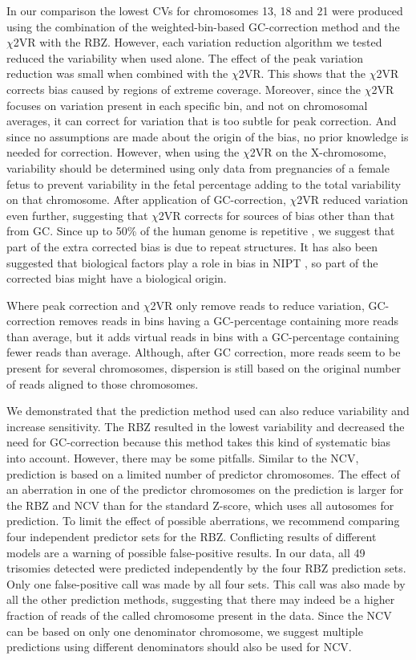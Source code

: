 In our comparison the lowest CVs for chromosomes 13, 18 and 21 were produced using the combination of the weighted-bin-based GC-correction method and the $\chi$2VR with the RBZ. 
However, each variation reduction algorithm we tested reduced the variability when used alone. 
The effect of the peak variation reduction was small when combined with the $\chi$2VR. 
This shows that the $\chi$2VR corrects bias caused by regions of extreme coverage. 
Moreover, since the $\chi$2VR focuses on variation present in each specific bin, and not on chromosomal averages, it can correct for variation that is too subtle for peak correction. 
And since no assumptions are made about the origin of the bias, no prior knowledge is needed for correction. 
However, when using the $\chi$2VR on the X-chromosome, variability should be determined using only data from pregnancies of a female fetus to prevent variability in the fetal percentage adding to the total variability on that chromosome. 
After application of GC-correction, $\chi$2VR reduced variation even further, suggesting that $\chi$2VR corrects for sources of bias other than that from GC. 
Since up to 50\% of the human genome is repetitive \cite{Smit_2013}, we suggest that part of the extra corrected bias is due to repeat structures. 
It has also been suggested that biological factors play a role in bias in NIPT \cite{van_den_Oever_2013,Chandrananda_2014}, so part of the corrected bias might have a biological origin.

Where peak correction and $\chi$2VR only remove reads to reduce variation, GC-correction removes reads in bins having a GC-percentage containing more reads than average, but it adds virtual reads in bins with a GC-percentage containing fewer reads than average. 
Although, after GC correction, more reads seem to be present for several chromosomes, dispersion is still based on the original number of reads aligned to those chromosomes.

We demonstrated that the prediction method used can also reduce variability and increase sensitivity. 
The RBZ resulted in the lowest variability and decreased the need for GC-correction because this method takes this kind of systematic bias into account. 
However, there may be some pitfalls. 
Similar to the NCV, prediction is based on a limited number of predictor chromosomes. 
The effect of an aberration in one of the predictor chromosomes on the prediction is larger for the RBZ and NCV than for the standard Z-score, which uses all autosomes for prediction. 
To limit the effect of possible aberrations, we recommend comparing four independent predictor sets for the RBZ. Conflicting results of different models are a warning of possible false-positive results. 
In our data, all 49 trisomies detected were predicted independently by the four RBZ prediction sets. 
Only one false-positive call was made by all four sets. 
This call was also made by all the other prediction methods, suggesting that there may indeed be a higher fraction of reads of the called chromosome present in the data. 
Since the NCV can be based on only one denominator chromosome, we suggest multiple predictions using different denominators should also be used for NCV.

